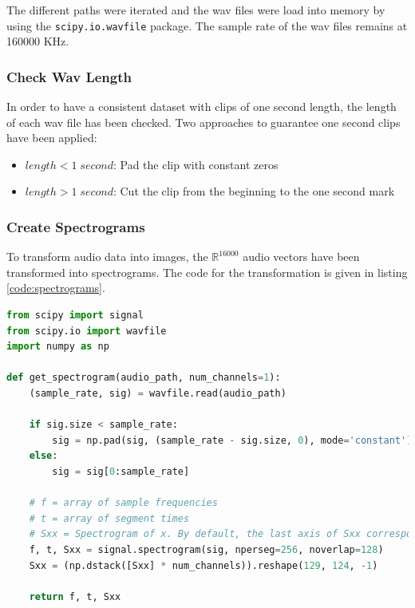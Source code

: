 \documentclass{article}
\theoremstyle{definition}
\theoremstyle{remark}
\begin{document}
The different paths were iterated and the wav files were load into memory by using the \texttt{scipy.io.wavfile} package. The sample rate of the wav files remains at 160000 KHz. 


\subsubsection{Check Wav Length}

In order to have a consistent dataset with clips of one second length, the length of each wav file has been checked. Two approaches to guarantee one second clips have been applied:

\begin{itemize}
	\item $length < 1 \; second$: Pad the clip with constant zeros
	\item $length > 1 \; second$: Cut the clip from the beginning to the one second mark
\end{itemize}
 

\subsubsection{Create Spectrograms}

To transform audio data into images, the $\mathbb{R}^{16000}$ audio vectors have been transformed into spectrograms. The code for the transformation is given in listing \ref{code:spectrograms}.



\begin{lstlisting}[language=Python, caption=Get spectrogram code, label=code:spectrograms]
from scipy import signal
from scipy.io import wavfile
import numpy as np

def get_spectrogram(audio_path, num_channels=1):
    (sample_rate, sig) = wavfile.read(audio_path)

    if sig.size < sample_rate:
        sig = np.pad(sig, (sample_rate - sig.size, 0), mode='constant')
    else:
        sig = sig[0:sample_rate]

    # f = array of sample frequencies
    # t = array of segment times
    # Sxx = Spectrogram of x. By default, the last axis of Sxx corresponds to the segment times.
    f, t, Sxx = signal.spectrogram(sig, nperseg=256, noverlap=128)
    Sxx = (np.dstack([Sxx] * num_channels)).reshape(129, 124, -1)

    return f, t, Sxx
\end{lstlisting}
\end{document}
